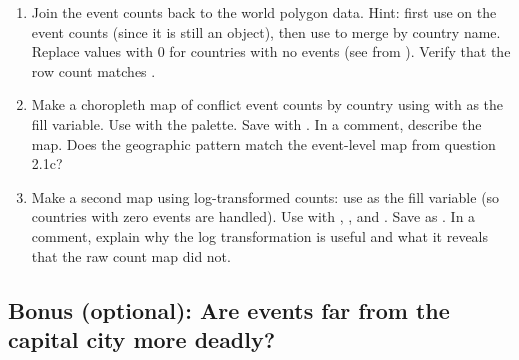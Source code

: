 \begin{enumerate}[label=\alph*)]
  \item Join the event counts back to the world polygon data. Hint: first use  on the event counts (since it is still an  object), then use  to merge by country name. Replace  values with 0 for countries with no events (see  from ). Verify that the row count matches .

  \item Make a choropleth map of conflict event counts by country using  with  as the fill variable. Use  with the  palette. Save with . In a comment, describe the map. Does the geographic pattern match the event-level map from question 2.1c?

  \item Make a second map using log-transformed counts: use  as the fill variable (so countries with zero events are handled). Use  with , , and . Save as . In a comment, explain why the log transformation is useful and what it reveals that the raw count map did not.
\end{enumerate}

\subsection{Bonus (optional): Are events far from the capital city more deadly?}

